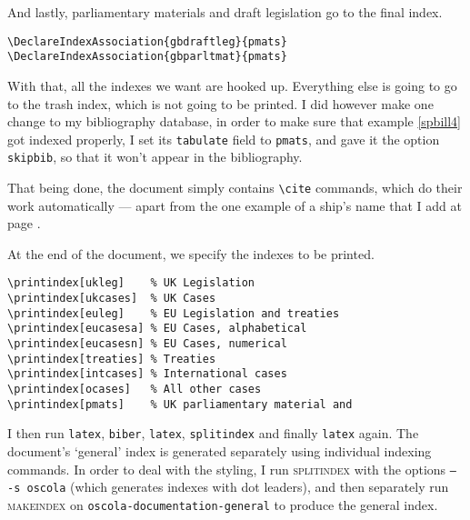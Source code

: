 \documentclass[a4paper,
               11pt,
	       DIV=1,			   
	       footinclude=false]
	      {scrartcl}
\begin{document}
And lastly, parliamentary materials and draft legislation go to the final index.
\begin{verbatim}
\DeclareIndexAssociation{gbdraftleg}{pmats}
\DeclareIndexAssociation{gbparltmat}{pmats}
\end{verbatim}

With that, all the indexes we want are hooked up. Everything else is going to go to the trash index, which is not going to be printed. I did however make one change to my bibliography database, in order to make sure that example \ref{spbill4} got indexed properly, I set its \texttt{tabulate} field to \texttt{pmats}, and gave it the option \texttt{skipbib}, so that it won't appear in the bibliography.

That being done, the document simply contains \verb|\cite| commands, which do their work automatically --- apart from the one example of a ship's name that I add at page \pageref{antaios85}.

At the end of the document, we specify the indexes to be printed.

\begin{verbatim}
\printindex[ukleg]    % UK Legislation
\printindex[ukcases]  % UK Cases
\printindex[euleg]    % EU Legislation and treaties
\printindex[eucasesa] % EU Cases, alphabetical
\printindex[eucasesn] % EU Cases, numerical
\printindex[treaties] % Treaties
\printindex[intcases] % International cases
\printindex[ocases]   % All other cases
\printindex[pmats]    % UK parliamentary material and
\end{verbatim}

I then run \texttt{latex}, \texttt{biber}, \texttt{latex}, \texttt{splitindex} and finally \texttt{latex} again. The document's `general' index is generated separately using individual indexing commands. In order to deal with the styling, I run \textsc{splitindex} with the options \texttt{-- -s oscola} (which generates indexes with dot leaders), and then separately run \textsc{makeindex} on \texttt{oscola-documentation-general} to produce the general index.
\end{document}
